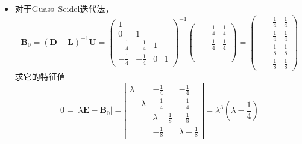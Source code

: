 \documentclass{sjtuarticle}
\begin{document}
\begin{itemize}
\begin{solution}
\begin{itemize}
\begin{equation*}
\begin{matrix}
                    -\frac14 & -\frac14 & \lambda\\
                    -\frac14 & -\frac14 & & \lambda
                \end{matrix}\right|=\lambda^2\left(\lambda-\frac{1}{2}\right)\left(\lambda+\frac{1}{2}\right)
            \end{equation*}
            得到 $\lambda_{1,2}=0,\lambda_3=\frac12,\lambda_4=-\frac12$，故谱半径 $\rho(\bm{B}_0)=\frac12$。
            \item[(2)] 对于Guass--Seidel迭代法，
            \begin{equation*}
                \bm{B}_0=(\bm{D}-\bm{L})^{-1}\bm{U}=\begin{pmatrix}
                    1 &  & & \\
                    0 & 1 & & \\
                    -\frac14 & -\frac14 & 1 &  \\
                    -\frac14 & -\frac14 & 0 & 1
                \end{pmatrix}^{-1}\begin{pmatrix}
                    &&\frac14 & \frac14 \\
                    &&\frac14 & \frac14 \\
                    \\
                    \\
                \end{pmatrix}=\begin{pmatrix}
                    && \frac14 & \frac14 \\
                    && \frac14 & \frac14 \\
                    && \frac18 & \frac18 \\
                    && \frac18 & \frac18
                \end{pmatrix}
            \end{equation*}
            求它的特征值
            \begin{equation*}
                0=|\lambda \bm{E}-\bm{B}_0|=\left|\begin{matrix}
                    \lambda && -\frac14 & -\frac14 \\
                    & \lambda & -\frac14 & -\frac14 \\
                    && \lambda - \frac18 & -\frac18 \\
                    && -\frac18 & \lambda - \frac18
                \end{matrix}\right|=\lambda^3\left(\lambda-\frac14\right)

\end{equation*}
\end{itemize}
\end{solution}
\end{itemize}
\end{document}
